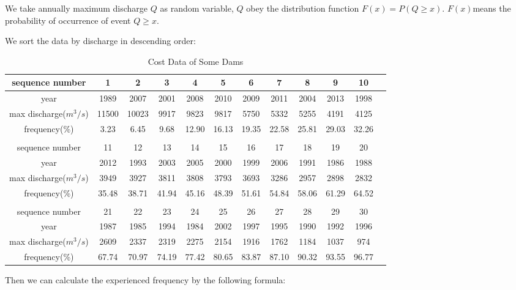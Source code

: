 \documentclass[12pt]{article}%
\begin{document}
\begin{enumerate}[1.]
	\par\noindent
	We take annually maximum discharge $Q$ as random variable, $Q$ obey the distribution function $F(x)=P(Q\geq x)$. $F(x)$means the probability of occurrence of event $Q\geq x$.
\par\noindent
We sort the data by discharge in descending order:
\begin{table}[H]
\centering
\footnotesize
\caption{Cost Data of Some Dams}
\label{dam}
\begin{tabular}{cccccccccccc}
\hline
sequence number  &  1  &  2  &  3  &  4  &  5  &  6  &  7  &  8  &  9  &  10\\
\hline
year  &  1989  &  2007  &  2001  &  2008  &  2010  &  2009  &  2011  &  2004  &  2013  &  1998\\
\hline
max discharge($m^3/s$)&  11500  &  10023  &  9917  &  9823  &  9817  &  5750  &  5332  &  5255  &  4191  &  4125\\
\hline
frequency(\%)  &  3.23  &  6.45  &  9.68  &  12.90  &  16.13  &  19.35  &  22.58  &  25.81  &  29.03  &  32.26\\
\hline
\\
\hline
sequence number  &  11  &  12  &  13  &  14  &  15  &  16  &  17  &  18  &  19  &  20\\
\hline
year  &  2012  &  1993  &  2003  &  2005  &  2000  &  1999  &  2006  &  1991  &  1986  &  1988\\
\hline
max discharge($m^3/s$)  &  3949  &  3927  &  3811  &  3808  &  3793  &  3693  &  3286  &  2957  &  2898  &  2832\\
\hline
frequency(\%)  &  35.48  &  38.71  &  41.94  &  45.16  &  48.39  &  51.61  &  54.84  &  58.06  &  61.29  &  64.52\\
\hline
\\
\hline
sequence number  &  21  &  22  &  23  &  24  &  25  &  26  &  27  &  28  &  29  &  30\\
\hline
year  &  1987  &  1985  &  1994  &  1984  &  2002  &  1997  &  1995  &  1990  &  1992  &  1996\\
\hline
max discharge($m^3/s$)  &  2609  &  2337  &  2319  &  2275  &  2154  &  1916  &  1762  &  1184  &  1037  &  974\\
\hline
frequency(\%)  &  67.74  &  70.97  &  74.19  &  77.42  &  80.65  &  83.87  &  87.10  &  90.32  &  93.55  &  96.77\\
\hline
\end{tabular}
\end{table}
Then we can calculate the experienced frequency by the following formula:

\end{enumerate}
\end{document}
